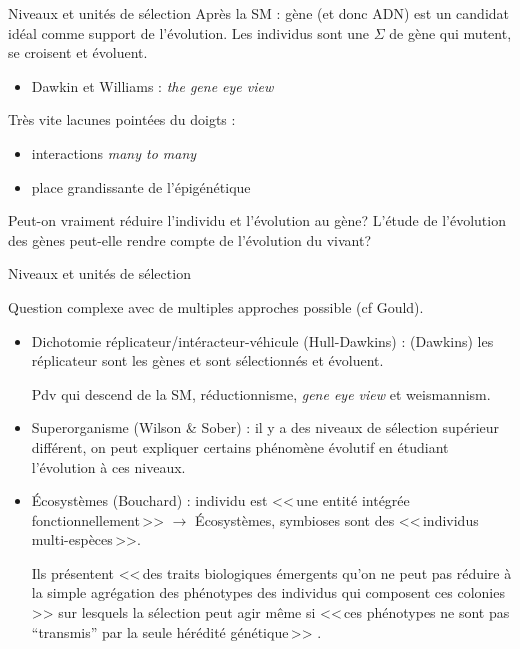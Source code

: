 \documentclass[8pt]{beamer}
\begin{document}
\begin{frame}{Niveaux et unités de sélection}
	Après la SM : gène (et donc ADN) est un candidat idéal comme support de l'évolution.
	\vfill
	Les individus sont une $\Sigma$ de gène qui mutent, se croisent et évoluent.
	\begin{itemize}
		\item Dawkin et Williams : \emph{the gene eye view}
	\end{itemize}

	\vfill

	Très vite lacunes pointées du doigts : 
	\begin{itemize}
		\item interactions \emph{many to many}
		\item place grandissante de l'épigénétique
	\end{itemize}
	\vfill

	Peut-on vraiment réduire l'individu et l'évolution au gène? L'étude de l'évolution des gènes peut-elle rendre compte de l'évolution du vivant?
\end{frame}


\begin{frame}{Niveaux et unités de sélection}

	Question complexe avec de multiples approches possible (cf Gould).

	\vfill

	\begin{itemize}
		\item Dichotomie réplicateur/intéracteur-véhicule (Hull-Dawkins) : (Dawkins) les réplicateur sont les gènes et sont sélectionnés et évoluent.
			
			Pdv qui descend de la SM, réductionnisme, \emph{gene eye view} et weismannism.

		\item Superorganisme (Wilson \& Sober) : il y a des niveaux de sélection supérieur différent, on peut expliquer certains phénomène évolutif en étudiant l'évolution à ces niveaux.

		\item \'Ecosystèmes (Bouchard) :  individu est <<\,une entité intégrée fonctionnellement\,>> $\rightarrow$ \'Ecosystèmes, symbioses sont des <<\,individus multi-espèces\,>>. 
			
		Ils présentent <<\,des traits biologiques émergents qu'on ne peut pas réduire à la simple agrégation des phénotypes des individus qui composent ces colonies\,>> sur lesquels la sélection peut agir même si <<\,ces phénotypes ne sont pas ``transmis'' par la seule hérédité génétique\,>> .
	\end{itemize}




\end{frame}
\end{document}
